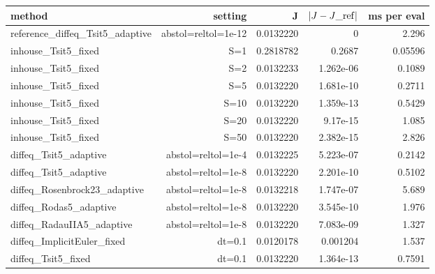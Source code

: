 \begin{tabular}{lrrrr}
\toprule
method & setting & J & $|J-J\_{\rm ref}|$ & ms per eval \\
\midrule
reference\_diffeq\_Tsit5\_adaptive & abstol=reltol=1e-12 & 0.0132220 & 0 & 2.296 \\
inhouse\_Tsit5\_fixed & S=1 & 0.2818782 & 0.2687 & 0.05596 \\
inhouse\_Tsit5\_fixed & S=2 & 0.0132233 & 1.262e-06 & 0.1089 \\
inhouse\_Tsit5\_fixed & S=5 & 0.0132220 & 1.681e-10 & 0.2711 \\
inhouse\_Tsit5\_fixed & S=10 & 0.0132220 & 1.359e-13 & 0.5429 \\
inhouse\_Tsit5\_fixed & S=20 & 0.0132220 & 9.17e-15 & 1.085 \\
inhouse\_Tsit5\_fixed & S=50 & 0.0132220 & 2.382e-15 & 2.826 \\
diffeq\_Tsit5\_adaptive & abstol=reltol=1e-4 & 0.0132225 & 5.223e-07 & 0.2142 \\
diffeq\_Tsit5\_adaptive & abstol=reltol=1e-8 & 0.0132220 & 2.201e-10 & 0.5102 \\
diffeq\_Rosenbrock23\_adaptive & abstol=reltol=1e-8 & 0.0132218 & 1.747e-07 & 5.689 \\
diffeq\_Rodas5\_adaptive & abstol=reltol=1e-8 & 0.0132220 & 3.545e-10 & 1.976 \\
diffeq\_RadauIIA5\_adaptive & abstol=reltol=1e-8 & 0.0132220 & 7.083e-09 & 1.327 \\
diffeq\_ImplicitEuler\_fixed & dt=0.1 & 0.0120178 & 0.001204 & 1.537 \\
diffeq\_Tsit5\_fixed & dt=0.1 & 0.0132220 & 1.364e-13 & 0.7591 \\
\bottomrule
\end{tabular}
